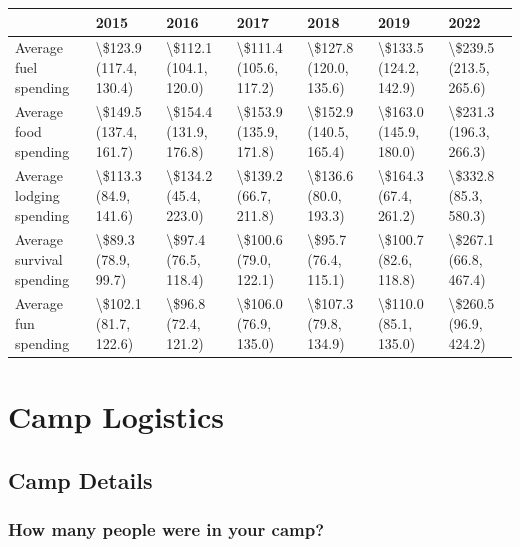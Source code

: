 \documentclass[
]{book}
\begin{document}
\begin{table}
\centering
\begin{tabular}[t]{>{}l|>{}l|>{}l|>{}l|>{}l|>{}l|>{}l}
\hline
  & 2015 & 2016 & 2017 & 2018 & 2019 & 2022\\
\hline
Average fuel spending & \textbackslash{}\$123.9 (117.4, 130.4) & \textbackslash{}\$112.1 (104.1, 120.0) & \textbackslash{}\$111.4 (105.6, 117.2) & \textbackslash{}\$127.8 (120.0, 135.6) & \textbackslash{}\$133.5 (124.2, 142.9) & \textbackslash{}\$239.5 (213.5, 265.6)\\
\hline
Average food spending & \textbackslash{}\$149.5 (137.4, 161.7) & \textbackslash{}\$154.4 (131.9, 176.8) & \textbackslash{}\$153.9 (135.9, 171.8) & \textbackslash{}\$152.9 (140.5, 165.4) & \textbackslash{}\$163.0 (145.9, 180.0) & \textbackslash{}\$231.3 (196.3, 266.3)\\
\hline
Average lodging spending & \textbackslash{}\$113.3 (84.9, 141.6) & \textbackslash{}\$134.2 (45.4, 223.0) & \textbackslash{}\$139.2 (66.7, 211.8) & \textbackslash{}\$136.6 (80.0, 193.3) & \textbackslash{}\$164.3 (67.4, 261.2) & \textbackslash{}\$332.8 (85.3, 580.3)\\
\hline
Average survival spending & \textbackslash{}\$89.3 (78.9, 99.7) & \textbackslash{}\$97.4 (76.5, 118.4) & \textbackslash{}\$100.6 (79.0, 122.1) & \textbackslash{}\$95.7 (76.4, 115.1) & \textbackslash{}\$100.7 (82.6, 118.8) & \textbackslash{}\$267.1 (66.8, 467.4)\\
\hline
Average fun spending & \textbackslash{}\$102.1 (81.7, 122.6) & \textbackslash{}\$96.8 (72.4, 121.2) & \textbackslash{}\$106.0 (76.9, 135.0) & \textbackslash{}\$107.3 (79.8, 134.9) & \textbackslash{}\$110.0 (85.1, 135.0) & \textbackslash{}\$260.5 (96.9, 424.2)\\
\hline
\end{tabular}
\end{table}

\hypertarget{camp-logistics}{%
\chapter{Camp Logistics}\label{camp-logistics}}

\hypertarget{camp-details}{%
\section{Camp Details}\label{camp-details}}

\hypertarget{how-many-people-were-in-your-camp}{%
\subsection{How many people were in your camp?}\label{how-many-people-were-in-your-camp}}
\end{document}
